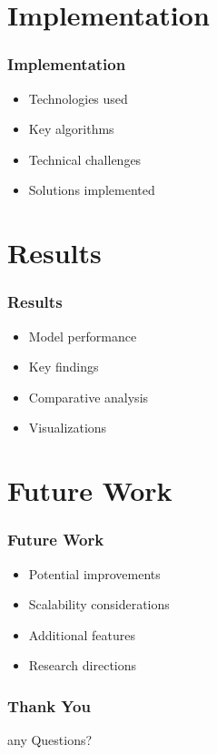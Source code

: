 \documentclass{beamer}
\begin{document}
\section{Implementation}
\begin{frame}
\frametitle{Implementation}
\begin{itemize}
    \item Technologies used
    \item Key algorithms
    \item Technical challenges
    \item Solutions implemented
\end{itemize}
\end{frame}

\section{Results}
\begin{frame}
\frametitle{Results}
\begin{itemize}
    \item Model performance
    \item Key findings
    \item Comparative analysis
    \item Visualizations
\end{itemize}
\end{frame}

\section{Future Work}
\begin{frame}
\frametitle{Future Work}
\begin{itemize}
    \item Potential improvements
    \item Scalability considerations
    \item Additional features
    \item Research directions
\end{itemize}
\end{frame}

\begin{frame}
\frametitle{Thank You}
\begin{center}
    any Questions?
\end{center}
\end{frame}
\end{document}
